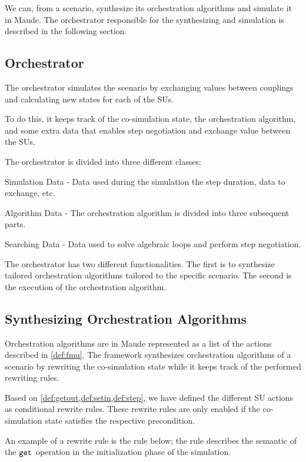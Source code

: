 We can, from a scenario, synthesize its orchestration algorithms and simulate it in Maude.
The orchestrator responsible for the synthesizing and simulation is described in the following section.  

\subsection{Orchestrator}
The orchestrator simulates the scenario by exchanging values between couplings and calculating new states for each of the SUs.

To do this, it keeps track of the co-simulation state, the orchestration algorithm, and some extra data that enables step negotiation and exchange value between the SUs.

The orchestrator is divided into three different classes:
\begin{compactitem}
  \item Simulation Data - Data used during the simulation the step duration, data to exchange, etc.
  \item Algorithm Data - The orchestration algorithm is divided into three subsequent parts. 
  \item Searching Data - Data used to solve algebraic loops and perform step negotiation.
\end{compactitem}

The orchestrator has two different functionalities.
The first is to synthesize tailored orchestration algorithms tailored to the specific scenario.
The second is the execution of the orchestration algorithm. 

\subsection{Synthesizing Orchestration Algorithms}
Orchestration algorithms are in Maude represented as a list of the actions described in \cref{def:fmu}.
The framework synthesizes orchestration algorithms of a scenario by rewriting the co-simulation state while it keeps track of the performed rewriting rules.

Based on \cref{def:getout,def:setin,def:step}, we have defined the different SU actions as conditional rewrite rules.
These rewrite rules are only enabled if the co-simulation state satisfies the respective precondition.

An example of a rewrite rule is the rule below; the rule describes the semantic of the $\mathtt{get}_{}$ operation in the initialization phase of the simulation.

